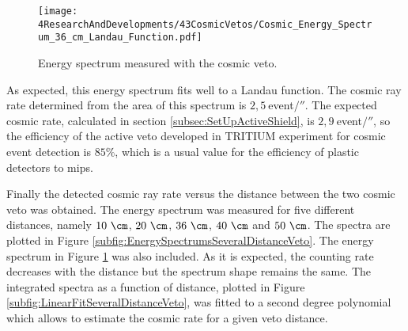 \begin{figure}[h]
\centering
\texttt{[image: 4ResearchAndDevelopments/43CosmicVetos/Cosmic\_Energy\_Spectrum\_36\_cm\_Landau\_Function.pdf]}
\caption{Energy spectrum measured with the cosmic veto.\label{fig:EnergySpectrumCosmicVeto}}
\end{figure}
As expected, this energy spectrum fits well to a Landau function. The cosmic ray rate determined from the area of this spectrum is $2,5~$event$/\second$. The expected cosmic rate, calculated in section \ref{subsec:SetUpActiveShield}, is $2,9~$event$/\second$, so the efficiency of the active veto developed in TRITIUM experiment for cosmic event detection is $85\%$, which is a usual value for the efficiency of plastic detectors to mips.

Finally the detected cosmic ray rate versus the distance between the two cosmic veto was obtained. The energy spectrum was measured for five different distances, namely $10~\cm$, $20~\cm$, $36~\cm$, $40~\cm$ and $50~\cm$. The spectra are plotted in Figure \ref{subfig:EnergySpectrumsSeveralDistanceVeto}. The energy spectrum in Figure \ref{fig:EnergySpectrumCosmicVeto} was also included. As it is expected, the counting rate decreases with the distance but the spectrum shape remains the same. The integrated spectra as a function of distance, plotted in Figure \ref{subfig:LinearFitSeveralDistanceVeto}, was fitted to a second degree polynomial which allows to estimate the cosmic rate for a given veto distance.





